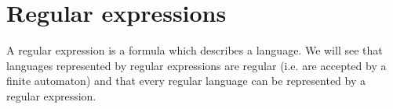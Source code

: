 

\setcounter{section}{2}
\setcounter{subsection}{1}
\setcounter{dfn}{0}

\section{Regular expressions}
A regular expression is a formula which describes a language.
We will see that languages represented by regular expressions are regular (i.e. are accepted by a finite automaton)
and that every regular language can be represented by a regular expression.


